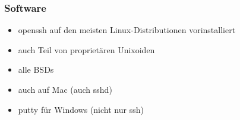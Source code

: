 \begin{frame}
\frametitle{Software}
\begin{itemize}
\item openssh auf den meisten Linux-Distributionen vorinstalliert
\pause
\item auch Teil von proprietären Unixoiden
\pause
\item alle BSDs
\pause
\item auch auf Mac (auch sshd)
\pause
\item putty für Windows (nicht nur ssh)
\end{itemize}
\end{frame}